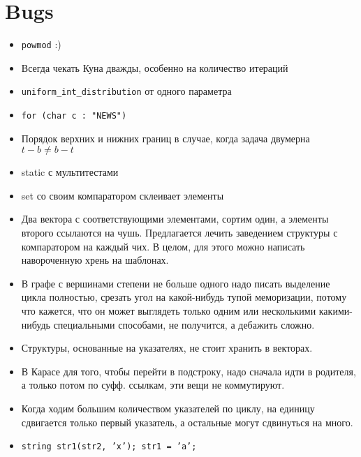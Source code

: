 \section{Bugs}

\begin{itemize}
	\item \texttt{powmod} :)

	\item Всегда чекать Куна дважды, особенно на количество итераций

	\item \texttt{uniform_int_distribution} от одного параметра

	\item \texttt{for (char c : "NEWS")}

	\item Порядок верхних и нижних границ в случае, когда задача двумерна
		$t - b \neq b - t$

	\item static с мультитестами

	\item set со своим компаратором склеивает элементы

	\item Два вектора с соответствующими элементами, сортим один, а элементы
		второго ссылаются на чушь. Предлагается лечить заведением структуры с
		компаратором на каждый чих. В целом, для этого можно написать навороченную
		хрень на шаблонах.

	\item В графе с вершинами степени не больше одного надо писать выделение
		цикла полностью, срезать угол на какой-нибудь тупой меморизации, потому
		что кажется, что он может выглядеть только одним или несколькими
		какими-нибудь специальными способами, не получится, а дебажить сложно.

	\item Структуры, основанные на указателях, не стоит хранить в векторах.

	\item В Карасе для того, чтобы перейти в подстроку, надо сначала идти в
		родителя, а только потом по суфф. ссылкам, эти вещи не коммутируют.

	\item Когда ходим большим количеством указателей по циклу, на единицу
		сдвигается только первый указатель, а остальные могут сдвинуться на много.

	\item \texttt{string str1(str2, 'x'); str1 = 'a';}
\end{itemize}
